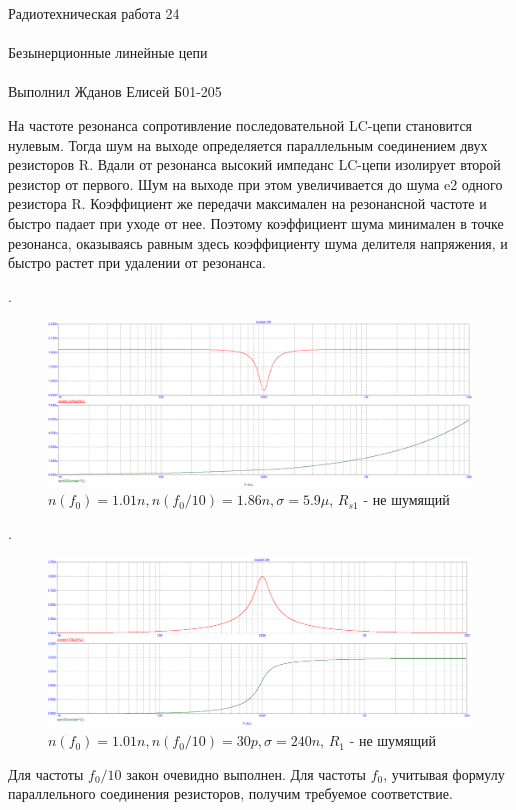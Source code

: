 \documentclass{astroedu-lab}
\begin{document}
\begin{problem}{\huge Радиотехническая работа 24\\\\Безынерционные линейные цепи\\\\Выполнил Жданов Елисей Б01-205}
\begin{enumerate}
На частоте резонанса сопротивление последовательной LC-цепи становится нулевым. Тогда шум на выходе определяется параллельным соединением двух резисторов R. Вдали от резонанса высокий импеданс LC-цепи изолирует второй резистор от первого. Шум на выходе при этом увеличивается до шума e2 одного резистора R. Коэффициент же передачи максимален на резонансной частоте и быстро падает при уходе от нее. Поэтому коэффициент шума минимален в точке резонанса, оказываясь равным здесь коэффициенту шума делителя напряжения, и быстро растет при удалении от резонанса.

\newpage

.

\begin{figure}[h!]
    \centering
    \includegraphics[scale=0.3]{images/mod4_1_2_2.png}
    \caption{$n(f_0) = 1.01n, n(f_0/10) = 1.86n, \sigma = 5.9 \mu$, $R_{s1}$ - не шумящий}
    \label{fig:m4122}
\end{figure}

.

\begin{figure}[h!]
    \centering
    \includegraphics[scale=0.3]{images/mod4_1_2_3.png}
    \caption{$n(f_0) = 1.01n, n(f_0/10) = 30p, \sigma = 240n$, $R_1$ - не шумящий}
    \label{fig:m4122}
\end{figure}

Для частоты $f_0 / 10$ закон очевидно выполнен. Для частоты $f_0$, учитывая формулу параллельного соединения резисторов, получим требуемое соответствие.



\end{enumerate}
\end{problem}
\end{document}
